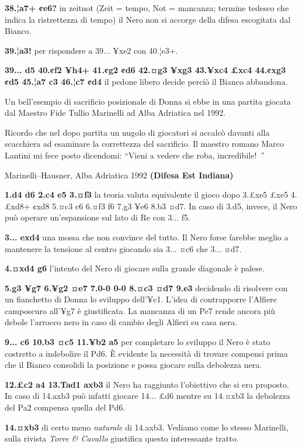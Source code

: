 \documentclass[
]{article}
\begin{document}
\textbf{38.¦a7+ ¢e6?} in zeitnot (Zeit = tempo, Not = mancanza; termine
tedesco che indica la ristrettezza di tempo) il Nero non si accorge
della difesa escogitata dal Bianco.

\textbf{39.¦a3!} per rispondere a 39... ¥xe2 con 40.¦e3+.

\textbf{39... d5 40.¢f2 ¥h4+ 41.¢g2 ¢d6 42.¤g3 ¥xg3 43.¥xc4 £xc4 44.¢xg3
¢d5 45.¦a7 c3 46.¦c7 ¢d4} il pedone libero decide perciò il Bianco
abbandona.

Un bell'esempio di sacrificio posizionale di Donna si ebbe in una
partita giocata dal Maestro Fide Tullio Marinelli ad Alba Adriatica nel
1992.

Ricordo che nel dopo partita un nugolo di giocatori si accalcò davanti
alla scacchiera ad esaminare la correttezza del sacrificio. Il maestro
romano Marco Lantini mi fece posto dicendomi: ``Vieni a vedere che roba,
incredibile!~''

Marinelli--Hausner, Alba Adriatica 1992 \textbf{(Difesa Est Indiana)}

\textbf{1.d4 d6 2.c4 e5 3.¤f3} la teoria valuta equivalente il gioco
dopo 3.£xe5 £xe5 4.£xd8+ ¢xd8 5.¤c3 c6 6.¤f3 f6 7.g3 ¥e6 8.b3 ¤d7. In
caso di 3.d5, invece, il Nero può operare un'espansione sul lato di Re
con 3... f5.

\textbf{3... exd4} una mossa che non convince del tutto. Il Nero forse
farebbe meglio a mantenere la tensione al centro giocando sia 3... ¤c6
che 3... ¤d7.

\textbf{4.¤xd4 g6} l'intento del Nero di giocare sulla grande diagonale
è palese.

\textbf{5.g3 ¥g7 6.¥g2 ¤e7 7.0-0 0-0 8.¤c3 ¤d7 9.e3} decidendo di
risolvere con un fianchetto di Donna lo sviluppo dell'¥c1. L'idea di
contrapporre l'Alfiere camposcuro all'¥g7 è giustificata. La mancanza di
un Pe7 rende ancora più debole l'arrocco nero in caso di cambio degli
Alfieri su casa nera.

\textbf{9... c6 10.b3 ¤c5 11.¥b2 a5} per completare lo sviluppo il Nero
è stato costretto a indebolire il Pd6. È evidente la necessità di
trovare compensi prima che il Bianco consolidi la posizione e possa
giocare sulla debolezza nera.

\textbf{12.£c2 a4 13.Tad1 axb3} il Nero ha raggiunto l'obiettivo che si
era proposto. In caso di 14.axb3 può infatti giocare 14... £d6 mentre su
14.¤xb3 la debolezza del Pa2 compensa quella del Pd6.

\textbf{14.¤xb3} di certo meno \emph{naturale} di 14.axb3. Vediamo come
lo stesso Marinelli, sulla rivista \emph{Torre \& Cavallo} giustifica
questo interessante tratto.
\end{document}
